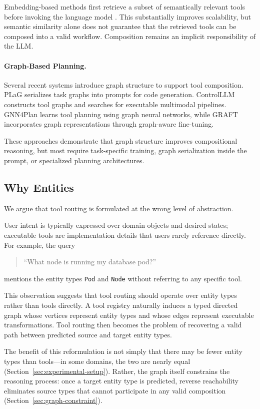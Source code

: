 Embedding-based methods first retrieve a subset of semantically relevant tools
before invoking the language model \cite{li2025toolscope}. This substantially
improves scalability, but semantic similarity alone does not guarantee that the
retrieved tools can be composed into a valid workflow. Composition remains an
implicit responsibility of the LLM.

\paragraph{Graph-Based Planning.}

Several recent systems introduce graph structure to support tool composition.
PLaG \cite{lin2024plag} serializes task graphs into prompts for code
generation. ControlLLM \cite{zhang2024controlllm} constructs tool graphs and
searches for executable multimodal pipelines. GNN4Plan
\cite{wang2024gnn4plan} learns tool planning using graph neural networks, while
GRAFT \cite{li2025graft} incorporates graph representations through
graph-aware fine-tuning.

These approaches demonstrate that graph structure improves compositional
reasoning, but most require task-specific training, graph serialization inside
the prompt, or specialized planning architectures.

\subsection{Why Entities}
\label{sec:why-entities}

We argue that tool routing is formulated at the wrong level of abstraction.

User intent is typically expressed over domain objects and desired states;
executable tools are implementation details that users rarely reference directly.
For example, the query

\begin{quote}
``What node is running my database pod?''
\end{quote}

mentions the entity types \texttt{Pod} and \texttt{Node} without referring to
any specific tool.

This observation suggests that tool routing should operate over entity types
rather than tools directly.
A tool registry naturally induces a typed directed graph whose vertices
represent entity types and whose edges represent executable transformations.
Tool routing then becomes the problem of recovering a valid path between
predicted source and target entity types.

The benefit of this reformulation is not simply that there may be fewer entity
types than tools---in some domains, the two are nearly equal
(Section~\ref{sec:experimental-setup}). Rather, the graph itself constrains
the reasoning process: once a target entity type is predicted, reverse
reachability eliminates source types that cannot participate in any valid
composition (Section~\ref{sec:graph-constraint}).